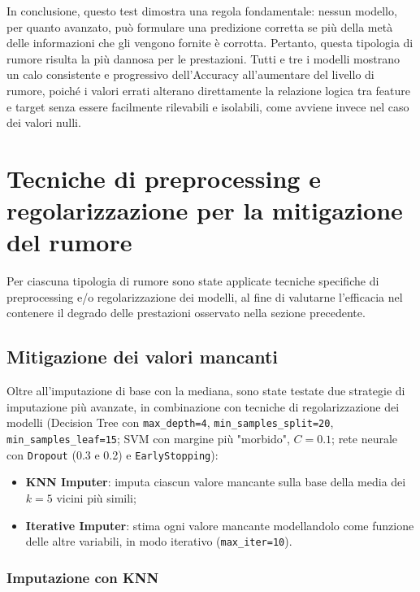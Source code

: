 \documentclass[12pt]{article}
\begin{document}
In conclusione, questo test dimostra una regola fondamentale: nessun modello, per quanto avanzato, può formulare una predizione corretta se più della metà delle informazioni che gli vengono fornite è corrotta. Pertanto, questa tipologia di rumore risulta la più dannosa per le prestazioni. Tutti e tre i modelli mostrano un calo consistente e progressivo dell'Accuracy all'aumentare del livello di rumore, poiché i valori errati alterano direttamente la relazione logica tra feature e target senza essere facilmente rilevabili e isolabili, come avviene invece nel caso dei valori nulli.

\section{Tecniche di preprocessing e regolarizzazione per la mitigazione del rumore}

Per ciascuna tipologia di rumore sono state applicate tecniche specifiche di preprocessing e/o regolarizzazione dei modelli, al fine di valutarne l'efficacia nel contenere il degrado delle prestazioni osservato nella sezione precedente.

\subsection{Mitigazione dei valori mancanti}

Oltre all'imputazione di base con la mediana, sono state testate due strategie di imputazione più avanzate, in combinazione con tecniche di regolarizzazione dei modelli (Decision Tree con \texttt{max\_depth=4}, \texttt{min\_samples\_split=20}, \texttt{min\_samples\_leaf=15}; SVM con margine più "morbido", $C=0.1$; rete neurale con \texttt{Dropout} (0.3 e 0.2) e \texttt{EarlyStopping}):

\begin{itemize}
    \item \textbf{KNN Imputer}: imputa ciascun valore mancante sulla base della media dei $k=5$ vicini più simili;
    \item \textbf{Iterative Imputer}: stima ogni valore mancante modellandolo come funzione delle altre variabili, in modo iterativo (\texttt{max\_iter=10}).
\end{itemize}

\subsubsection{Imputazione con KNN}
\end{document}
